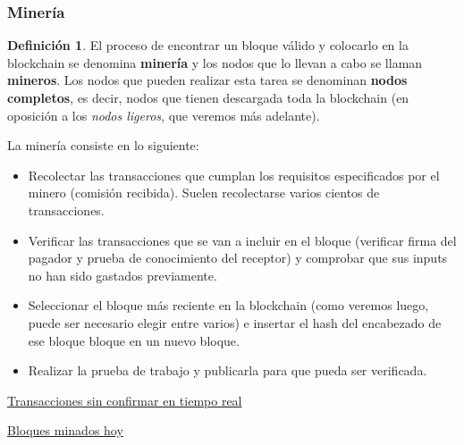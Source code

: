 \documentclass{beamer}
\theoremstyle{definition}
\newtheorem{defi}{Definición}
\begin{document}
\begin{frame}
	\frametitle{Minería}
	\begin{defi}
		El proceso de encontrar un bloque válido y colocarlo en la blockchain se denomina \textbf{minería} y los nodos que lo llevan a cabo se llaman \textbf{mineros}. Los nodos que pueden realizar esta tarea se denominan \textbf{nodos completos}, es decir, nodos que tienen descargada toda la blockchain (en oposición a los \emph{nodos ligeros}, que veremos más adelante).
	\end{defi}
\end{frame}

\begin{frame}
	La minería consiste en lo siguiente:
	\begin{itemize}
		\item<2-> Recolectar las transacciones que cumplan los requisitos especificados por el minero (comisión recibida). Suelen recolectarse varios cientos de transacciones.
		\item<3-> Verificar las transacciones que se van a incluir en el bloque (verificar firma del pagador y prueba de conocimiento del receptor) y comprobar que sus inputs no han sido gastados previamente.
		\item<4-> Seleccionar el bloque más reciente en la blockchain (como veremos luego, puede ser necesario elegir entre varios) e insertar el hash del encabezado de ese bloque bloque en un nuevo bloque.
		\item<5-> Realizar la prueba de trabajo y publicarla para que pueda ser verificada.  %
	\end{itemize}
\end{frame}


\begin{frame}
	\href{https://www.blockchain.com/btc/unconfirmed-transactions}{Transacciones sin confirmar en tiempo real}
	
	\href{https://www.blockchain.com/btc/blocks}{Bloques minados hoy}
	
\end{frame}
\end{document}
